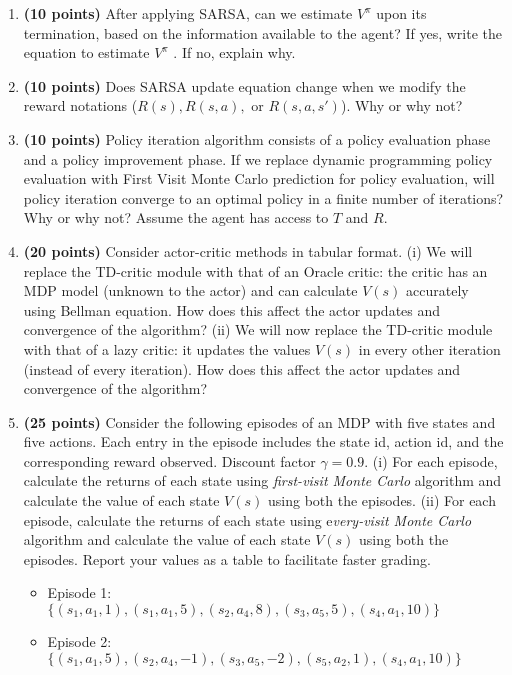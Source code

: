 \documentclass[11pt]{article}
\begin{document}
	\begin{enumerate}
	\item \textbf{(10 points)} After applying SARSA, can we estimate $V^\pi$ upon its termination, based on the information available to the agent? If yes, write the equation to estimate $V^\pi$ . If no, explain why.
	
	
	\item \textbf{(10 points)} Does SARSA update equation change when we modify the reward notations ($R(s), R(s,a),$ or $R(s,a,s')$). Why or why not?
	
	\item \textbf{(10 points)} Policy iteration algorithm consists of a policy evaluation phase and a policy improvement phase. If we replace dynamic programming policy evaluation with First Visit Monte Carlo prediction for policy evaluation, will policy iteration converge to an optimal policy in a finite number of iterations? Why or why not? Assume the agent has access to $T$ and $R$.
	
	\item \textbf{(20 points)} Consider actor-critic methods in tabular format. (i) We will replace the TD-critic module with that of an Oracle critic: the critic has an MDP model (unknown to the actor) and can calculate $V(s)$ accurately using Bellman equation. How does this affect the actor updates and convergence of the algorithm? (ii) We will now replace the TD-critic module with that of a lazy critic: it updates the values $V(s)$ in every other iteration (instead of every iteration). How does this affect the actor updates and convergence of the algorithm?
	
	\item  \textbf{(25 points)}  Consider the following episodes of an MDP with five states and five actions. Each entry in the episode includes the state id, action id, and the corresponding reward observed. Discount factor $\gamma =0.9$. (i) For each episode, calculate the returns of each state using \textit{first-visit Monte Carlo} algorithm and  calculate the value of each state $V(s)$ using both the episodes. (ii) For each episode, calculate the returns of each state using e\textit{very-visit Monte Carlo} algorithm and  calculate the value of each state $V(s)$ using both the episodes. Report your values as a table to facilitate faster grading. 
	\begin{itemize}
		\item Episode 1: $\{(s_1, a_1, 1) , (s_1, a_1, 5),  (s_2, a_4, 8), (s_3, a_5, 5), (s_4, a_1, 10)   \}$
		\item Episode 2: $\{(s_1, a_1, 5),  (s_2, a_4, -1), (s_3, a_5, -2), (s_5, a_2, 1), (s_4, a_1, 10)   \}$
	\end{itemize}  


\end{enumerate}
\end{document}
